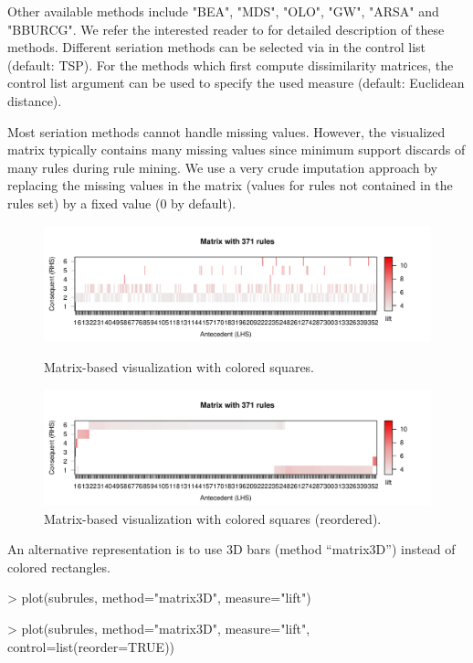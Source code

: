 \documentclass[nojss]{jss}
\begin{document}
Other available methods include "BEA", "MDS", "OLO", "GW", "ARSA" and "BBURCG".
We refer the interested reader to \cite{arulesViz:Hahsler:2008} for
detailed description of these methods.
Different seriation
methods can be selected via  in the control list
(default: TSP). For the methods which first compute dissimilarity matrices,
the control list argument  can be used to specify the
used measure (default: Euclidean distance).

Most seriation methods cannot handle missing values.
However, the visualized matrix typically contains many missing values since
minimum support discards of many rules during rule mining.  We use a very crude
imputation approach by replacing the missing values in the matrix (values for
rules not contained in the rules set) by a fixed value (0 by default).

\begin{figure}
\centering
\includegraphics[width=\linewidth]{arulesViz-matrix1}
\caption{Matrix-based visualization with colored squares.
\label{fig:matrix1}}

\vspace{5mm}

\includegraphics[width=\linewidth]{arulesViz-matrix2}
\caption{Matrix-based visualization with colored squares (reordered).
\label{fig:matrix2}}
\end{figure}


An alternative representation is to use
3D bars (method ``matrix3D'') instead of colored rectangles.

\begin{Schunk}
\begin{Sinput}
> plot(subrules, method="matrix3D", measure="lift")
\end{Sinput}
\end{Schunk}
\begin{Schunk}
\begin{Sinput}
> plot(subrules, method="matrix3D", measure="lift", control=list(reorder=TRUE))
\end{Sinput}
\end{Schunk}
\end{document}
